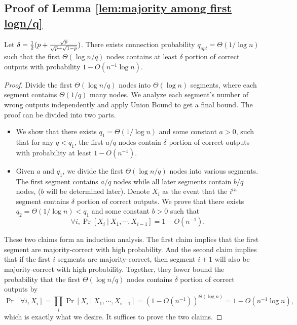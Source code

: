\documentclass[a4paper,UKenglish]{lipics}
\theoremstyle{definition}
\begin{document}
\subsection {Proof of Lemma \ref{lem:majority among first logn/q}}
\label {subsec:majority among first logn/q}

Let $\delta = {1\over 2}(p + {\sqrt{p}\over \sqrt{p} + \sqrt{1-p}})$.
There exists connection probability $q_{opt} = \Theta(1/\log n)$ such that the first $\Theta(\log n/q)$ nodes 
	contains at least $\delta$ portion of correct outputs with probability $1 - O(n^{-1}\log n)$.

\begin{proof}
Divide the first $\Theta(\log n/q)$ nodes into $\Theta(\log n)$ segments, where each segment contains $\Theta(1/q)$ many nodes.
We analyze each segment's number of wrong outputs independently and apply Union Bound to get a final bound.
The proof can be divided into two parts.
\begin{itemize}
\item We show that there exists $q_1 = \Theta(1/\log n)$ and some constant $a > 0$, such that for any $q < q_1$, 
	the first $a/q$ nodes contain $\delta$ portion of correct outputs with probability at least $1 - O(n^{-1})$.
\item Given $a$ and $q_1$, we divide the first $\Theta(\log n / q)$ nodes into various segments.
	The first segment contains $a/q$ nodes while all later segments contain $b/q$ nodes, ($b$ will be determined later).
	Denote $X_i$ as the event that the $i^{th}$ segment contains $\delta$ portion of correct outputs.
	We prove that there exists $q_2 = \Theta(1/\log n) < q_1$ and some constant $b > 0$ such that
	\begin{equation*}
		\forall i, \Pr[X_{i}~|~X_1, \dotsb, X_{i-1}] = 1 - O(n^{-1}).
	\end{equation*}
\end{itemize}
These two claims form an induction analysis.
The first claim implies that the first segment are majority-correct with high probability.
And the second claim implies that if the first $i$ segments are majority-correct, 
	then segment $i+1$ will also be majority-correct with high probability.
Together, they lower bound the probability that the first $\Theta(\log n / q)$ nodes contains $\delta$ portion of correct outputs by
\begin{equation*}
	\Pr[ \forall i, X_i] 
= 
	\prod_{i} \Pr[X_{i}~|~X_1, \dotsb, X_{i-1}] 
= 
	(1 - O(n^{-1}))^{\Theta(\log n)} = 1 - O(n^{-1}\log n),
\end{equation*}
which is exactly what we desire.
It suffices to prove the two claims.


\end{proof}
\end{document}

